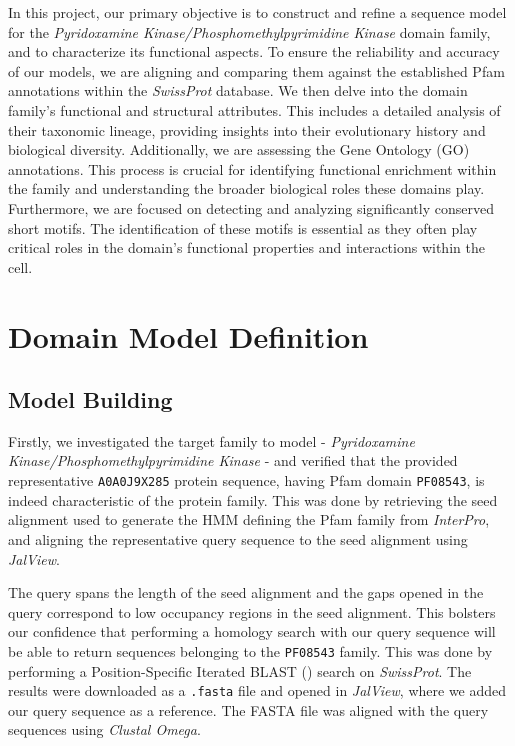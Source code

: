 \documentclass[10pt,twocolumn,letterpaper]{article}
\begin{document}
In this project, our primary objective is to construct and refine a sequence model for the \textit{Pyridoxamine Kinase/Phosphomethylpyrimidine Kinase} domain family, and to characterize its functional aspects. To ensure the reliability and accuracy of our models, we are aligning and comparing them against the established Pfam annotations within the \textit{SwissProt} database. We then delve into the domain family's functional and structural attributes. This includes a detailed analysis of their taxonomic lineage, providing insights into their evolutionary history and biological diversity. Additionally, we are assessing the Gene Ontology (GO) annotations. This process is crucial for identifying functional enrichment within the family and understanding the broader biological roles these domains play. Furthermore, we are focused on detecting and analyzing significantly conserved short motifs. The identification of these motifs is essential as they often play critical roles in the domain's functional properties and interactions within the cell.

\section{Domain Model Definition}

\subsection{Model Building}

Firstly, we investigated the target family to model - \textit{Pyridoxamine Kinase/Phosphomethylpyrimidine Kinase} - and verified that the provided representative \texttt{A0A0J9X285} protein sequence, having Pfam domain \texttt{PF08543}, is indeed characteristic of the protein family. 
This was done by retrieving the seed alignment used to generate the HMM defining the Pfam family from \textit{InterPro}, and aligning the representative query sequence to the seed alignment using \textit{JalView}.

The query spans the length of the seed alignment and the gaps opened in the query correspond to low occupancy regions in the seed alignment. This bolsters our confidence that performing a homology search with our query sequence will be able to return sequences belonging to the \texttt{PF08543} family. This was done by performing a Position-Specific Iterated BLAST () search on \textit{SwissProt}. The results were downloaded as a \texttt{.fasta} file and opened in \textit{JalView}, where we added our query sequence as a reference. The FASTA file was aligned with the query sequences using \textit{Clustal Omega}.
\end{document}
